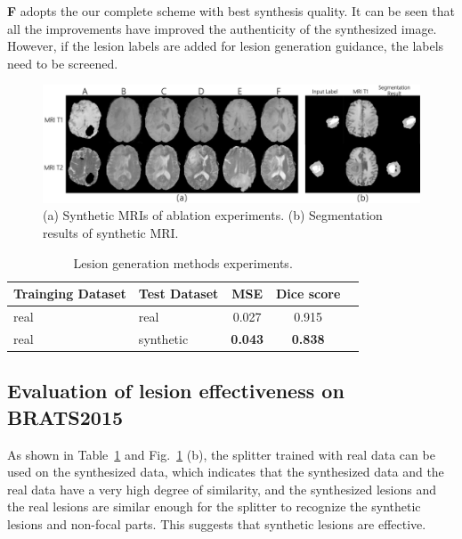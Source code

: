 \documentclass[runningheads]{llncs}
\begin{document}
	\textbf{F} adopts the our complete scheme with best synthesis quality. It can be seen that all the improvements have improved the authenticity of the synthesized image. However, if the lesion labels are added for lesion generation guidance,  the labels need to be screened.
	\begin{figure}
		\centering
		\includegraphics[width=0.85\linewidth]{figures/ablation}
		\caption{(a) Synthetic MRIs of ablation experiments. (b) Segmentation results of synthetic MRI. }
		\label{ablation_and_seg}
	\end{figure}
	\begin{table}
	\begin{center}
		\caption{Lesion generation methods experiments.}
		\label{label_test}
		\begin{tabular}{llccc}
			\hline	
			Trainging Dataset &Test Dataset &MSE   &Dice score \\
			\hline
			real &real 	    &0.027          &0.915 \\							
			real &synthetic	&\textbf{0.043} &\textbf{0.838} \\
			\hline
		\end{tabular}
	\end{center}
\end{table}
	\subsection{Evaluation of lesion effectiveness on BRATS2015}
	\label{label gen methods tests}
	As shown in Table~\ref{label_test} and Fig.~\ref{ablation_and_seg} (b), the splitter trained with real data can be used on the synthesized data, which indicates that the synthesized data and the real data have a very high degree of similarity, and the synthesized lesions and the real lesions are similar enough for the splitter to recognize the synthetic lesions and non-focal parts. This suggests that synthetic lesions are effective.
\end{document}
